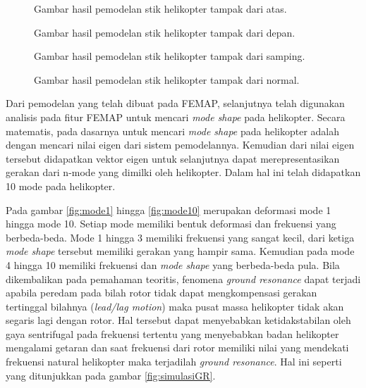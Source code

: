 \begin{figure}[H]
	\centering
	\caption{Gambar hasil pemodelan stik helikopter tampak dari atas.}
	\label{fig:simulasi_tampak_atas}
\end{figure}

\begin{figure}[H]
	\centering
	\caption{Gambar hasil pemodelan stik helikopter tampak dari depan.}
	\label{fig:simulasi_tampak_depan}
\end{figure}

\begin{figure}[H]
	\centering
	\caption{Gambar hasil pemodelan stik helikopter tampak dari samping.}
	\label{fig:simulasi_tampak_samping}
\end{figure}

\begin{figure}[H]
	\centering
	\caption{Gambar hasil pemodelan stik helikopter tampak dari normal.}
	\label{fig:simulasi_tampak_normal}
\end{figure}

Dari pemodelan yang telah dibuat pada FEMAP, selanjutnya telah digunakan analisis pada fitur FEMAP untuk mencari \textit{mode shape} pada helikopter. Secara matematis, pada dasarnya untuk mencari \textit{mode shape} pada helikopter adalah dengan mencari nilai eigen dari sistem pemodelannya. Kemudian dari nilai eigen tersebut didapatkan vektor eigen untuk selanjutnya dapat merepresentasikan gerakan dari n-mode yang dimilki oleh helikopter. Dalam hal ini telah didapatkan 10 mode pada helikopter.

Pada gambar \ref{fig:mode1} hingga \ref{fig:mode10} merupakan deformasi mode 1 hingga mode 10. Setiap mode memiliki bentuk deformasi dan frekuensi yang berbeda-beda. Mode 1 hingga 3 memiliki frekuensi yang sangat kecil, dari ketiga \textit{mode shape} tersebut memiliki gerakan yang hampir sama. Kemudian pada mode 4 hingga 10 memiliki frekuensi dan \textit{mode shape} yang berbeda-beda pula. Bila dikembalikan pada pemahaman teoritis, fenomena \textit{ground resonance} dapat terjadi apabila peredam pada bilah rotor tidak dapat mengkompensasi gerakan tertinggal bilahnya (\textit{lead/lag motion}) maka pusat massa helikopter tidak akan segaris lagi dengan rotor. Hal tersebut dapat menyebabkan ketidakstabilan oleh gaya sentrifugal pada frekuensi tertentu yang menyebabkan badan helikopter mengalami getaran dan saat frekuensi dari rotor memiliki nilai yang mendekati frekuensi natural helikopter maka terjadilah \textit{ground resonance}. Hal ini seperti yang ditunjukkan pada gambar \ref{fig:simulasiGR}.


